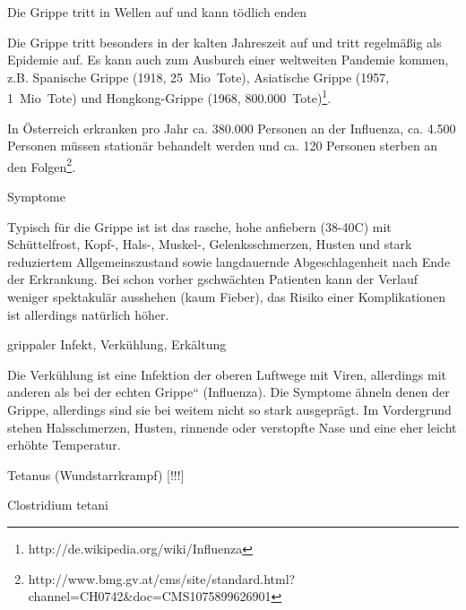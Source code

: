\documentclass{article}
\begin{document}
Die Grippe tritt in Wellen auf und kann t\"odlich enden

Die Grippe tritt besonders in der kalten Jahreszeit auf und tritt
regelm\"a{\ss}ig als Epidemie auf. Es kann auch zum
Ausburch einer weltweiten Pandemie kommen, z.B.
Spanische Grippe (1918, 25~Mio~Tote), Asiatische Grippe (1957,
1~Mio~Tote) und  Hongkong-Grippe (1968,
800.000~Tote)\footnote{http://de.wikipedia.org/wiki/Influenza}. 

In \"Osterreich erkranken pro Jahr ca. 380.000 Personen an der
Influenza, ca. 4.500 Personen m\"ussen station\"ar behandelt werden und
ca. 120 Personen sterben an den
Folgen\footnote{http://www.bmg.gv.at/cms/site/standard.html?channel=CH0742\&doc=CMS1075899626901}.

Symptome

Typisch f\"ur die Grippe ist ist das rasche, hohe anfiebern
(38{\textdegree}-40{\textdegree}C) mit Sch\"uttelfrost,  Kopf-, Hals-,
Muskel-, Gelenksschmerzen, Husten und stark reduziertem
Allgemeinszustand sowie langdauernde Abgeschlagenheit nach Ende der
Erkrankung. Bei schon vorher gschw\"achten Patienten kann der Verlauf
weniger spektakul\"ar ausshehen (kaum Fieber), das Risiko einer
Komplikationen ist allerdings nat\"urlich h\"oher. 

grippaler Infekt,
Verk\"uhlung, Erk\"altung

Die Verk\"uhlung ist eine Infektion der oberen Luftwege mit Viren,
allerdings mit anderen als bei der {\quotedblbase}echten
Grippe{\textquotedblleft} (Influenza). Die Symptome \"ahneln denen der
Grippe, allerdings sind sie bei weitem nicht so stark ausgepr\"agt. Im
Vordergrund stehen Halsschmerzen, Husten, rinnende oder verstopfte Nase
und eine eher leicht erh\"ohte Temperatur. 

Tetanus (Wundstarrkrampf) [!!!]

Clostridium tetani
\end{document}
